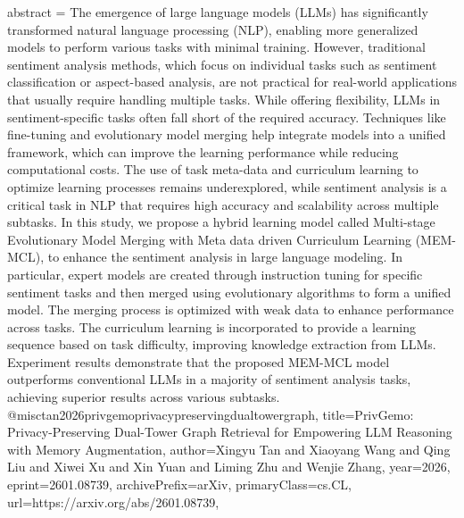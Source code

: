 {      abstract = {The emergence of large language models (LLMs) has significantly transformed natural language processing (NLP), enabling more generalized models to perform various tasks with minimal training. However, traditional sentiment analysis methods, which focus on individual tasks such as sentiment classification or aspect-based analysis, are not practical for real-world applications that usually require handling multiple tasks. While offering flexibility, LLMs in sentiment-specific tasks often fall short of the required accuracy. Techniques like fine-tuning and evolutionary model merging help integrate models into a unified framework, which can improve the learning performance while reducing computational costs. The use of task meta-data and curriculum learning to optimize learning processes remains underexplored, while sentiment analysis is a critical task in NLP that requires high accuracy and scalability across multiple subtasks. In this study, we propose a hybrid learning model called Multi-stage Evolutionary Model Merging with Meta data driven Curriculum Learning (MEM-MCL), to enhance the sentiment analysis in large language modeling. In particular, expert models are created through instruction tuning for specific sentiment tasks and then merged using evolutionary algorithms to form a unified model. The merging process is optimized with weak data to enhance performance across tasks. The curriculum learning is incorporated to provide a learning sequence based on task difficulty, improving knowledge extraction from LLMs. Experiment results demonstrate that the proposed MEM-MCL model outperforms conventional LLMs in a majority of sentiment analysis tasks, achieving superior results across various subtasks.}
}@misc{tan2026privgemoprivacypreservingdualtowergraph,
      title={PrivGemo: Privacy-Preserving Dual-Tower Graph Retrieval for Empowering LLM Reasoning with Memory Augmentation}, 
      author={Xingyu Tan and Xiaoyang Wang and Qing Liu and Xiwei Xu and Xin Yuan and Liming Zhu and Wenjie Zhang},
      year={2026},
      eprint={2601.08739},
      archivePrefix={arXiv},
      primaryClass={cs.CL},
      url={https://arxiv.org/abs/2601.08739},
}
